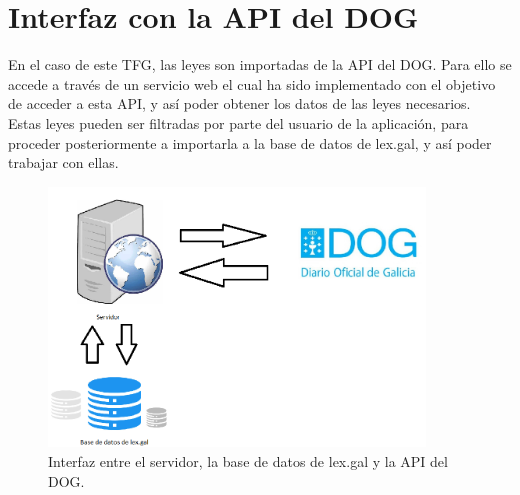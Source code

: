 \section{Interfaz con la API del DOG}

En el caso de este TFG, las leyes son importadas de la API del DOG. Para ello se accede a través de un servicio web el cual ha sido implementado con el objetivo de acceder a esta API, y así poder obtener los datos de las leyes necesarios.
\\

Estas leyes pueden ser filtradas por parte del usuario de la aplicación, para proceder posteriormente a importarla a la base de datos de lex.gal, y así poder trabajar con ellas.

\begin{figure}[H]
\centerline{\includegraphics[width=10cm]{figuras/interfazDOG.png}}
\caption{Interfaz entre el servidor, la base de datos de lex.gal y la API del DOG.}
\label{enlaceInterfazDOG}
\end{figure}